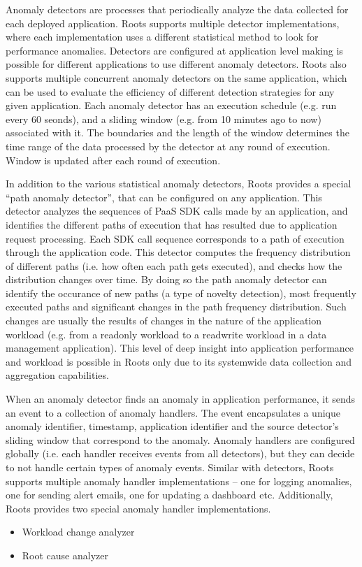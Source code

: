Anomaly detectors are processes that periodically analyze the data collected for
each deployed application. Roots supports multiple detector implementations, where each implementation
uses a different statistical method to look for performance anomalies. Detectors are configured
at application level making is possible for different applications to use different anomaly 
detectors. Roots also supports multiple concurrent anomaly detectors on the same application, which can be used
to evaluate the efficiency of different detection strategies for any given application. Each
anomaly detector has an execution schedule (e.g. run every 60 seonds), and a sliding window 
(e.g. from 10 minutes ago to now)
associated with it. The boundaries and the length of the window determines the time range
of the data processed by the detector at any round of execution. Window is updated 
after each round of execution.

In addition to the various statistical anomaly detectors, Roots provides a special
``path anomaly detector'', that can be configured on any application. This detector
analyzes the sequences of PaaS SDK calls made by an application, and identifies the
different paths of execution that has resulted due to application request processing.
Each SDK call sequence corresponds to a path of execution through the application code.
This detector computes the frequency distribution of different paths (i.e. how often each path
gets executed), and checks how the distribution changes over time. By doing so the path anomaly
detector can identify the occurance of new paths (a type of novelty detection), most
frequently executed paths and
significant changes in the path frequency distribution. Such changes are usually
the results of changes in the nature of the application workload (e.g. from a readonly
workload to a readwrite workload in a data management application). 
This level of deep insight into application
performance and workload is possible in Roots only due to its systemwide data
collection and aggregation capabilities.

When an anomaly detector finds an anomaly in application performance, it sends an event
to a collection of anomaly handlers. The event encapsulates a unique anomaly identifier, 
timestamp, application identifier and the source detector's sliding window that correspond to the
anomaly. Anomaly handlers are configured globally (i.e. each handler
receives events from all detectors), but they can decide to not handle certain types
of anomaly events. Similar with detectors, Roots supports multiple anomaly handler
implementations -- one for logging anomalies, one for sending alert emails, one
for updating a dashboard etc. Additionally, Roots provides two special anomaly handler
implementations.
\begin{itemize}
\item Workload change analyzer
\item Root cause analyzer
\end{itemize}

